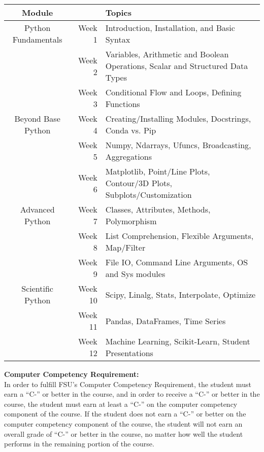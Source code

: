 \documentclass[11pt]{article}
\begin{document}
\begin{table}[h!]
\normalsize %
\begin{center}
{\renewcommand{\arraystretch}{1.5}
    \begin{tabular}{crp{8cm}}
    \toprule
    Module &  & Topics \\
    \hline
    Python Fundamentals & Week 1 & Introduction, Installation, and Basic Syntax \\
                        & Week 2 & Variables, Arithmetic and Boolean Operations, Scalar and Structured Data Types \\
                        & Week 3 & Conditional Flow and Loops, Defining Functions \\
    Beyond Base Python  & Week 4 & Creating/Installing Modules, Docstrings, Conda vs. Pip \\
                        & Week 5 & Numpy, Ndarrays, Ufuncs, Broadcasting, Aggregations \\
                        & Week 6 & Matplotlib, Point/Line Plots,  Contour/3D Plots, Subplots/Customization \\
    Advanced Python     & Week 7 & Classes, Attributes, Methods, Polymorphism \\
                        & Week 8 & List Comprehension, Flexible Arguments, Map/Filter \\
                        & Week 9 & File IO, Command Line Arguments, OS and Sys modules \\
    Scientific Python   & Week 10& Scipy, Linalg, Stats, Interpolate, Optimize \\
                        & Week 11& Pandas, DataFrames, Time Series \\
                        & Week 12& Machine Learning, Scikit-Learn, Student Presentations \\
    \end{tabular}
}
\end{center}
\end{table}

\newpage

\textbf{\large Computer Competency Requirement:}\\
In order to fulfill FSU’s Computer Competency Requirement, the student must earn a “C-” or better in the
course, and in order to receive a “C-” or better in the course, the student must earn at least a “C-” on the
computer competency component of the course. If the student does not earn a “C-” or better on the computer
competency component of the course, the student will not earn an overall grade of “C-” or better in the course,
no matter how well the student performs in the remaining portion of the course.\\
\end{document}
